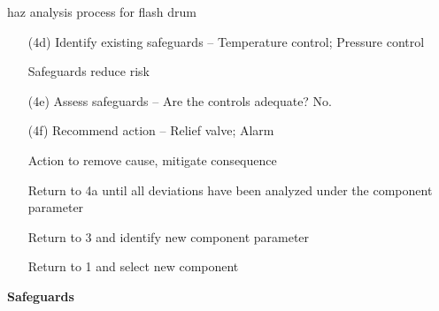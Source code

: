 \documentclass[aspectratio=1610,pdftex,dvipsnames,compress,xcolor={dvipsnames}]{beamer}
\newcommand{\acs}{\acrshort} %
\begin{document}
\begin{frame}{\acs{haz} analysis process for flash drum}
    \begin{enumerate}[series=outerlist,topsep=0pt,itemsep=1pt,leftmargin=*,label=(\arabic*)]
        \item[(4d)]Identify existing safeguards -- Temperature control; Pressure control 
        \item[]Safeguards reduce risk
            \vspace{0.15in}
        \item[(4e)]Assess safeguards -- Are the controls adequate? No.
            \vspace{0.15in}
        \item[(4f)]Recommend action -- Relief valve; Alarm
        \item[]Action to remove cause, mitigate consequence
            \vspace{0.15in}
        \item[]Return to 4a until all deviations have been analyzed under the component parameter
            \vspace{0.15in}
        \item[]Return to 3 and identify new component parameter
            \vspace{0.15in}
        \item[]Return to 1 and select new component
    \end{enumerate}
\end{frame}


\begin{frame}[plain]{}
    \centering\LARGE\textbf{Safeguards}
\end{frame}
\end{document}
